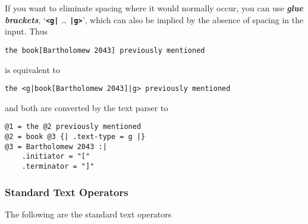 \documentclass[12pt]{article}
\newcommand{\TT}[1]{{\tt \bfseries #1}}
\newcommand{\skey}[2]{{\bf \em #1#2}\index{#1}}
\newenvironment{indpar}[1][0.3in]%
	{\begin{list}{}%
		     {\setlength{\itemsep}{0in}%
		      \setlength{\topsep}{0in}%
		      \setlength{\parsep}{1ex}%
		      \setlength{\labelwidth}{#1}%
		      \setlength{\leftmargin}{#1}%
		      \addtolength{\leftmargin}{\labelsep}}%
	 \item}%
	{\end{list}}
\begin{document}
If you want to eliminate spacing where it would normally occur,
you can use \skey{glue bracket}s, `\TT{<g|} \ldots{} \TT{|g>}',
which can also be implied by the absence of spacing in the input.
Thus

\begin{indpar}\begin{verbatim}
the book[Bartholomew 2043] previously mentioned
\end{verbatim}\end{indpar}

is equivalent to

\begin{indpar}\begin{verbatim}
the <g|book[Bartholomew 2043]|g> previously mentioned
\end{verbatim}\end{indpar}

and both are converted by the text parser to

\begin{indpar}\begin{verbatim}
@1 = the @2 previously mentioned
@2 = book @3 {| .text-type = g |}
@3 = Bartholomew 2043 :|
    .initiator = "["
    .terminator = "]"
\end{verbatim}\end{indpar}

\subsubsection{Standard Text Operators}
\label{STANDARD-TEXT-OPERATORS}

The following are the standard text operators
\end{document}
